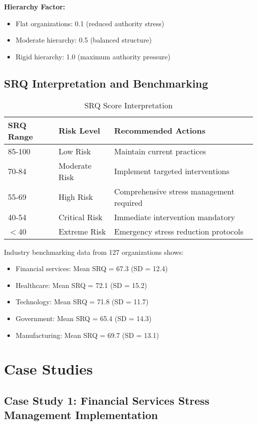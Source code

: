 \documentclass[11pt,a4paper]{article}
\begin{document}
\textbf{Hierarchy Factor:}
\begin{itemize}
\item Flat organizations: 0.1 (reduced authority stress)
\item Moderate hierarchy: 0.5 (balanced structure)
\item Rigid hierarchy: 1.0 (maximum authority pressure)
\end{itemize}

\subsection{SRQ Interpretation and Benchmarking}

\begin{table}[H]
\centering
\caption{SRQ Score Interpretation}
\label{tab:srq_interpretation}
\begin{tabular}{lll}
\toprule
SRQ Range & Risk Level & Recommended Actions \\
\midrule
85-100 & Low Risk & Maintain current practices \\
70-84 & Moderate Risk & Implement targeted interventions \\
55-69 & High Risk & Comprehensive stress management required \\
40-54 & Critical Risk & Immediate intervention mandatory \\
$<$40 & Extreme Risk & Emergency stress reduction protocols \\
\bottomrule
\end{tabular}
\end{table}

\FloatBarrier

Industry benchmarking data from 127 organizations shows:
\begin{itemize}
\item Financial services: Mean SRQ = 67.3 (SD = 12.4)
\item Healthcare: Mean SRQ = 72.1 (SD = 15.2)
\item Technology: Mean SRQ = 71.8 (SD = 11.7)
\item Government: Mean SRQ = 65.4 (SD = 14.3)
\item Manufacturing: Mean SRQ = 69.7 (SD = 13.1)
\end{itemize}

\section{Case Studies}

\subsection{Case Study 1: Financial Services Stress Management Implementation}
\end{document}
